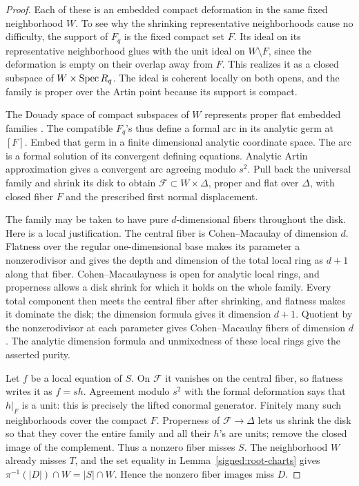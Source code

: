 \begin{proof}
Each of these is an embedded compact deformation in the
same fixed neighborhood \(W\).  To see why the shrinking
representative neighborhoods cause no difficulty, the
support of \(F_q\) is the fixed compact set \(F\).  Its
ideal on its representative neighborhood glues with the
unit ideal on \(W\setminus F\), since the deformation is
empty on their overlap away from \(F\).  This realizes it
as a closed subspace of \(W\times\operatorname{Spec} R_q\).  The ideal
is coherent locally on both opens, and the family is proper
over the Artin point because its support is compact.

The Douady space of compact subspaces of \(W\) represents
proper flat embedded families \cite[Section~9]{Douady1966}.
The compatible \(F_q\)'s thus define a formal arc in its
analytic germ at \([F]\).  Embed that germ in a finite
dimensional analytic coordinate space.  The arc is a formal
solution of its convergent defining equations.  Analytic
Artin approximation \cite[Theorem~1.2]{Artin1968} gives a
convergent arc agreeing modulo \(s^2\).  Pull back the
universal family and shrink its disk to obtain
\(\mathscr F\subset W\times\Delta\), proper and flat over
\(\Delta\), with closed fiber \(F\) and the prescribed
first normal displacement.

The family may be taken to have pure \(d\)-dimensional
fibers throughout the disk.  Here is a local justification.
The central fiber is Cohen--Macaulay of dimension \(d\).
Flatness over the regular one-dimensional base makes its
parameter a nonzerodivisor and gives the depth and dimension
of the total local ring as \(d+1\) along that fiber.
Cohen--Macaulayness is open for analytic local rings, and
properness allows a disk shrink for which it holds on the
whole family.  Every total component then meets the central
fiber after shrinking, and flatness makes it dominate the
disk; the dimension formula gives it dimension \(d+1\).
Quotient by the nonzerodivisor at each
parameter gives Cohen--Macaulay fibers of dimension \(d\).
The analytic dimension formula and unmixedness of these
local rings give the asserted purity.

Let \(f\) be a local equation of \(S\).  On \(\mathscr F\)
it vanishes on the central fiber, so flatness writes it as
\(f=s h\).  Agreement modulo \(s^2\) with the formal
deformation says that \(h|_F\) is a unit: this is precisely
the lifted conormal generator.  Finitely many such
neighborhoods cover the compact \(F\).  Properness of
\(\mathscr F\to\Delta\) lets us shrink the disk so that
they cover the entire family and all their \(h\)'s are
units; remove the closed image of the complement.  Thus a
nonzero fiber misses \(S\).  The neighborhood \(W\) already
misses \(T\), and the set equality in Lemma~\ref{signed:root-charts} gives
\(\pi^{-1}(|D|)\cap W=|S|\cap W\).  Hence the
nonzero fiber images miss \(D\).


\end{proof}

